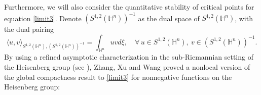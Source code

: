 \documentclass[11pt]{article}
\begin{document}
Furthermore, we will also consider the quantitative
stability of critical points for equation \eqref{limit3}.
Denote $(S^{1,2}(\mathbb{H}^{n}))^{-1}$ as the dual space of $S^{1,2}(\mathbb{H}^{n})$, with the dual pairing
\begin{equation*}
  \langle u,v\rangle_{S^{1,2}(\mathbb{H}^{n}),(S^{1,2}(\mathbb{H}^{n}))^{-1}} =\int_{\mathbb{H}^{n}}uv d\xi,\quad \forall \, u\in S^{1,2}(\mathbb{H}^{n}),\ v\in (S^{1,2}(\mathbb{H}^{n}))^{-1}.
\end{equation*}
By using a refined asymptotic characterization in the sub-Riemannian setting of the Heisenberg group (see \cite[Theorem 1.1]{B08}), Zhang, Xu and Wang \cite{ZXW25} proved a nonlocal version of the global compactness result to \eqref{limit3} for nonnegative functions on the Heisenberg group:
\end{document}
